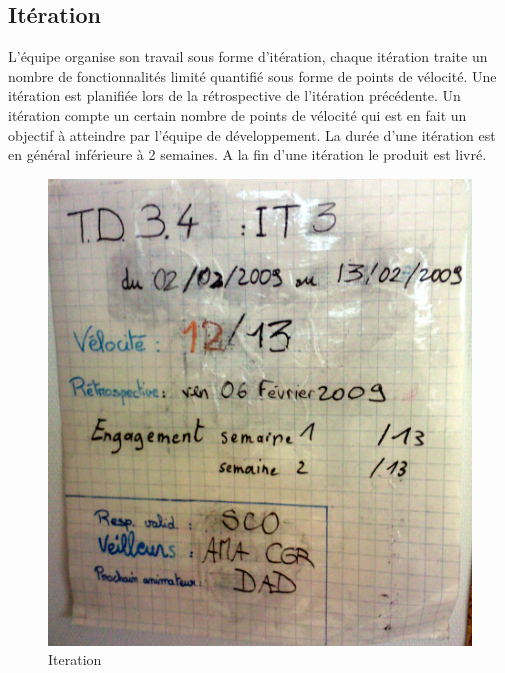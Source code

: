 \subsection{Itération}
L'équipe organise son travail sous forme d'itération, chaque itération traite un nombre de fonctionnalités limité quantifié sous forme de points de vélocité. Une itération est planifiée lors de la rétrospective de l'itération précédente. Un itération compte un certain nombre de points de vélocité qui est en fait un objectif à atteindre par l'équipe de développement. La durée d'une itération est en général inférieure à 2 semaines. A la fin d'une itération le produit est livré.
\begin{figure}[!h]
\centering
\includegraphics[scale=0.10]{Illustrations/SP_A0182.jpg}
\caption{Iteration}
\label{fig:Iteration}
\end{figure}


